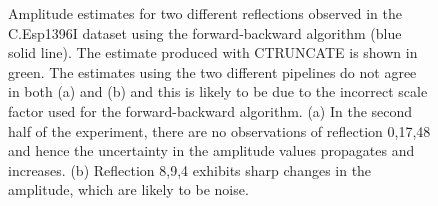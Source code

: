 \begin{figure}
\begin{subfigure}[b]{1.0\textwidth}
            \caption{}
            \label{fig:Amplitude estimates ref 8,9,4 - C.Esp1396I}
    \end{subfigure}
    \caption[Amplitude estimates for two different reflections observed in the C.Esp1396I dataset using the forward-backward algorithm.]{Amplitude estimates for two different reflections observed in the C.Esp1396I dataset using the forward-backward algorithm (blue solid line).
    The estimate produced with CTRUNCATE is shown in green.
    The estimates using the two different pipelines do not agree in both (a) and (b) and this is likely to be due to the incorrect scale factor used for the forward-backward algorithm.
    (a) In the second half of the experiment, there are no observations of reflection 0,17,48 and hence the uncertainty in the amplitude values propagates and increases.
    (b) Reflection 8,9,4 exhibits sharp changes in the amplitude, which are likely to be noise.}
    \label{fig:Amplitude estimates - C.Esp1396I}
\end{figure}

